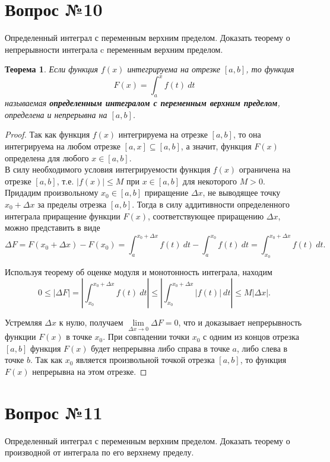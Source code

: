 \documentclass[12pt]{report}
\numberwithin{equation}{section}
\newtheorem{theorem}{Теорема}[section]
\begin{document}
\newpage \section{Вопрос №10} %
\begin{framed}
Определенный интеграл с переменным верхним пределом. Доказать теорему о непрерывности интеграла c переменным верхним пределом.
\end{framed}
\begin{theorem} \label{th:10:1}
Если функция $f(x)$ интегрируема на отрезке $[a,b]$, то функция
\begin{equation} \label{eq:10:1}
F(x) = \int_a^x f(t)~dt
\end{equation}
называемая \textbf{определенным интегралом с переменным верхним пределом}, определена и непрерывна на $[a,b]$.
\end{theorem}
\begin{proof}
Так как функция $f(x)$ интегрируема на отрезке $[a,b]$, то она интегрируема на любом отрезке $[a,x] \subseteq [a,b]$, а значит, функция $F(x)$ определена для любого $x \in [a,b]$.\\

В силу необходимого условия интегрируемости функция $f(x)$ ограничена на отрезке $[a,b]$, т.е. $|f(x)| \leqslant M$ при $x \in [a,b]$ для некоторого $M > 0$. Придадим произвольному $x_0 \in [a,b]$ приращение $\Delta x$, не выводящее точку $x_0 + \Delta x$ за пределы отрезка $[a,b]$. Тогда в силу аддитивности определенного интеграла приращение функции $F(x)$, соответствующее приращению $\Delta x$, можно представить в виде
\[ \Delta F = F(x_0 + \Delta x) - F(x_0) = \int_a^{x_0 + \Delta x} f(t)~dt - \int_a^{x_0} f(t)~dt = \int_{x_0}^{x_0 + \Delta x} f(t)~ dt.\]

Используя теорему об оценке модуля и монотонность интеграла, находим
\[ 0 \leqslant |\Delta F| = \left|\int_{x_0}^{x_0 + \Delta x} f(t)~ dt \right| \leqslant \left|\int_{x_0}^{x_0 + \Delta x} |f(t)|~ dt \right| \leqslant M|\Delta x|.\]

Устремляя $\Delta x$ к нулю, получаем $\lim\limits_{\Delta x \to 0} \Delta F = 0$, что и доказывает непрерывность функции $F(x)$ в точке $x_0$. При совпадении точки $x_0$ с одним из концов отрезка $[a,b]$ функция $F(x)$ будет непрерывна либо справа в точке $a$, либо слева в точке $b$. Так как $x_0$ является произвольной точкой отрезка $[a,b]$, то функция $F(x)$ непрерывна на этом отрезке.
\end{proof}

\newpage \section{Вопрос №11} %
\begin{framed}
Определенный интеграл с переменным верхним пределом. Доказать теорему о производной от интеграла по его верхнему пределу.
\end{framed}
\end{document}
